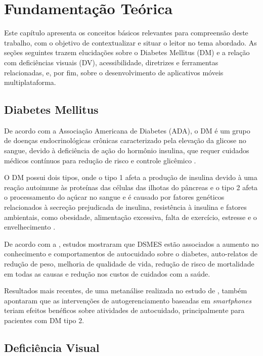 \chapter{Fundamentação Teórica}

Este capítulo apresenta os conceitos básicos relevantes para compreensão deste trabalho,
com o objetivo de contextualizar e situar o leitor no tema abordado.
As seções seguintes trazem elucidações sobre o Diabetes Mellitus (DM) e a relação com deficiências visuais (DV),
acessibilidade, diretrizes e ferramentas relacionadas, e, por fim, sobre o desenvolvimento de aplicativos móveis multiplataforma.

\section{Diabetes Mellitus}

De acordo com a Associação Americana de Diabetes (ADA), o DM é um grupo de doenças endocrinológicas crônicas
caracterizado pela elevação da glicose no sangue, devido à deficiência de ação do hormônio insulina, que requer cuidados médicos
contínuos para redução de risco e controle glicêmico \cite{ADA2019}.

O DM possui dois tipos, onde o tipo 1 afeta a produção de insulina devido à uma reação autoimune às proteínas das células das
ilhotas do pâncreas e o tipo 2 afeta o processamento do açúcar no sangue e é causado por fatores genéticos relacionados à
secreção prejudicada de insulina, resistência à insulina e fatores ambientais, como obesidade, alimentação excessiva, falta de
exercício, estresse e o envelhecimento \cite{Ozougwu_2013}.

De acordo com a , estudos mostraram que DSMES estão associados a aumento no conhecimento e comportamentos de
autocuidado sobre o diabetes, auto-relatos de redução de peso, melhoria de qualidade de vida, redução de risco de mortalidade
em todas as causas e redução nos custos de cuidados com a saúde.

Resultados mais recentes, de uma metanálise realizada no estudo de , também apontaram que as intervenções
de autogerenciamento baseadas em \emph{smartphones} teriam efeitos benéficos sobre atividades de autocuidado, principalmente para
pacientes com DM tipo 2.

\section{Deficiência Visual}

